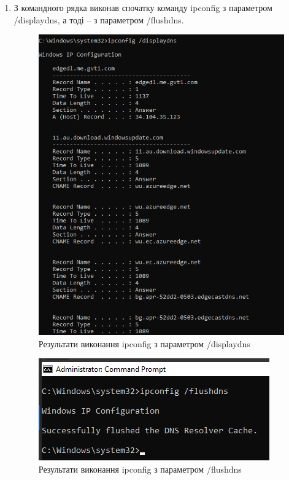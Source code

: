 \documentclass{article}
\begin{document}
\begin{normalsize}
\begin{enumerate}
\item З командного рядка виконав спочатку команду ipconfig з параметром /displaydns, а тоді – з параметром /flushdns. 
	\begin{figure}[H]
	\centering
	\includegraphics[scale=0.7]{5}
	\caption{Результати виконання ipconfig з параметром /displaydns
	}
\end{figure}
\begin{figure}[H]
	\centering
	\includegraphics[scale=0.7]{6}
	\caption{Результати виконання ipconfig з параметром /flushdns
	}
\end{figure}


\end{enumerate}
\end{normalsize}
\end{document}
